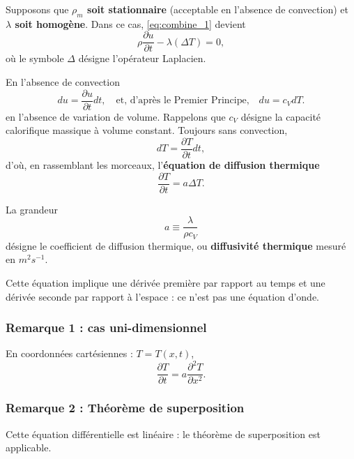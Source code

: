 \documentclass[11pt,a4paper]{report}
\begin{document}
Supposons que \textbf{$\rho_m$ soit stationnaire} (acceptable en l'absence de convection) et \textbf{$\lambda$ soit homogène}. Dans ce cas, \eqref{eq:combine_1} devient
\begin{equation}
	\rho\frac{\partial u}{\partial t} -\lambda \left(\Delta T\right) = 0,
\end{equation}
où le symbole $\Delta$ désigne l'opérateur Laplacien.

En l'absence de convection
\begin{equation}
	du = \frac{\partial u}{\partial t} dt,\quad\text{et, d'après le Premier Principe,}\quad
	\boxed{du = c_{V} dT}.
\end{equation}
en l'absence de variation de volume. Rappelons que $c_V$ désigne la capacité calorifique massique à volume constant. Toujours sans convection,
\begin{equation}
	dT = \frac{\partial T}{\partial t}dt,
\end{equation}
d'où, en rassemblant les morceaux, l'\textbf{équation de diffusion thermique}
\begin{equation}
	\boxed{\frac{\partial T}{\partial t} = a\Delta T}.
\end{equation}

La grandeur
\begin{equation}
	\boxed{a \equiv \frac{\lambda}{\rho c_{V}}}
\end{equation}
désigne le coefficient de diffusion thermique, ou \textbf{diffusivité thermique} mesuré en $m^2s^{-1}$.

Cette équation implique une dérivée première par rapport au temps et une dérivée seconde par rapport à l'espace : ce n'est pas une équation d'onde.

\subsubsection{Remarque 1 : cas uni-dimensionnel}
En coordonnées cartésiennes : $T = T(x,t)$,
\begin{equation}
	\boxed{\frac{\partial T}{\partial t} = a\frac{\partial^2 T}{\partial x^2}}.
\end{equation}

\subsubsection{Remarque 2 : Théorème de superposition}
Cette équation différentielle est linéaire : le théorème de superposition est applicable.
\end{document}
